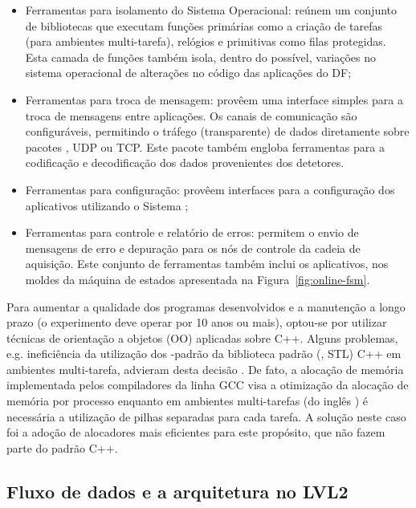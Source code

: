 \begin{itemize}
\item Ferramentas para isolamento do Sistema Operacional: reúnem um
conjunto de bibliotecas que executam funções primárias como a criação de
tarefas (para ambientes multi-tarefa), relógios e primitivas como filas
protegidas. Esta camada de funções também isola, dentro do possível, variações
no sistema operacional de alterações no código das aplicações do DF;

\item Ferramentas para troca de mensagem: provêem uma interface simples para a
troca de mensagens entre aplicações. Os canais de comunicação são
configuráveis, permitindo o tráfego (transparente) de dados diretamente sobre
pacotes , UDP ou TCP. Este pacote também engloba ferramentas
para a codificação e decodificação dos dados provenientes dos detetores.

\item Ferramentas para configuração: provêem interfaces para a configuração dos
aplicativos utilizando o Sistema ;

\item Ferramentas para controle e relatório de erros: permitem o envio de
mensagens de erro e depuração para os nós de controle da cadeia de
aquisição. Este conjunto de ferramentas também inclui os aplicativos, nos
moldes da máquina de estados apresentada na Figura~\ref{fig:online-fsm}.
\end{itemize}

Para aumentar a qualidade dos programas desenvolvidos e a manutenção a longo
prazo (o experimento deve operar por 10 anos ou mais), optou-se por utilizar
técnicas de orientação a objetos (OO) aplicadas sobre C++. Alguns problemas,
e.g. ineficiência da utilização dos -padrão da biblioteca
padrão (, STL) C++ em ambientes multi-tarefa,
advieram desta decisão \cite{aa:chep-2003}. De fato, a alocação de memória
implementada pelos compiladores da linha GCC \cite{web:gcc, web:gcc-stl} visa
a otimização da alocação de memória por processo enquanto em ambientes
multi-tarefas (do inglês ) é necessária a utilização de
pilhas separadas para cada tarefa. A solução neste caso foi a adoção de
alocadores mais eficientes para este propósito, que não fazem parte do padrão
C++.

\subsection{Fluxo de dados e a arquitetura no LVL2}
\label{sec:lvl2arch}

